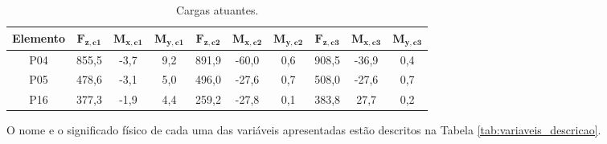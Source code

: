 \begin{table}[htpb!]
\centering
\caption{Cargas atuantes.}
\label{tab:carga_atuante_real}
\setlength{\tabcolsep}{5pt}
\begin{tabular}{ c c c c c c c c c c}
\toprule
\textbf{Elemento} &
$\mathbf{F_{z,c1}}$ &
$\mathbf{M_{x,c1}}$ &
$\mathbf{M_{y,c1}}$ &
$\mathbf{F_{z,c2}}$ &
$\mathbf{M_{x,c2}}$ &
$\mathbf{M_{y,c2}}$ &
$\mathbf{F_{z,c3}}$ &
$\mathbf{M_{x,c3}}$ &
$\mathbf{M_{y,c3}}$ \\
\midrule
P04 & 855,5 & -3,7 & 9,2 & 891,9 & -60,0 & 0,6 & 908,5 & -36,9 & 0,4 \\
P05 & 478,6 & -3,1 & 5,0 & 496,0 & -27,6 & 0,7 & 508,0 & -27,6 & 0,7 \\
P16 & 377,3 & -1,9 & 4,4 & 259,2 & -27,8 & 0,1 & 383,8 & 27,7 & 0,2 \\
\bottomrule
\end{tabular}
\end{table}


O nome e o significado físico de cada uma das variáveis apresentadas estão descritos na Tabela \ref{tab:variaveis_descricao}.  

